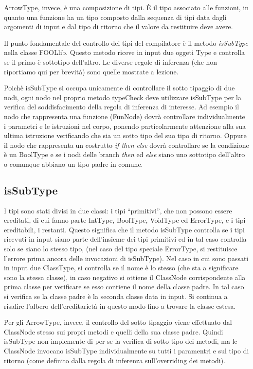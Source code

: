 \documentclass{scrreprt}
\begin{document}
ArrowType, invece, è una composizione di tipi. È il tipo associato alle funzioni, in quanto una funzione ha un tipo composto dalla sequenza di tipi data dagli argomenti di input e dal tipo di ritorno che il valore da restituire deve avere.

Il punto fondamentale del controllo dei tipi del compilatore è il metodo \textit{isSubType} nella classe FOOLlib. Questo metodo riceve in input
due oggeti Type e controlla se il primo è sottotipo dell'altro. Le diverse regole di inferenza (che non riportiamo qui per brevità) sono quelle mostrate a lezione.

Poichè isSubType si occupa unicamente di controllare il sotto tipaggio di due nodi, ogni nodo nel proprio metodo typeCheck deve utilizzare isSubType per la verifica del soddisfacimento della
regola di inferenza di interesse. Ad esempio il nodo che rappresenta una funzione (FunNode) dovrà controllare individualmente i parametri e le istruzioni nel corpo, ponendo particolarmente attenzione alla sua ultima istruzione verificando che sia un sotto tipo del suo tipo di ritorno. 
Oppure il nodo che rappresenta un costrutto \textit{if then else} dovrà
controllare se la condizione è un BoolType e se i nodi delle branch \textit{then} ed \textit{else} siano uno sottotipo dell'altro o comunque abbiano un tipo padre in comune.

\subsection{isSubType}

I tipi sono stati divisi in due classi: i tipi ``primitivi'', che non possono essere ereditati, di cui fanno parte
IntType, BoolType, VoidType ed ErrorType, e i tipi ereditabili, i restanti. Questo significa che il metodo isSubType 
controlla se i tipi ricevuti in input siano parte dell'insieme dei tipi primitivi ed in tal caso controlla solo se siano lo
stesso tipo, (nel caso del tipo speciale ErrorType, si restituisce l'errore prima ancora delle invocazioni di isSubType).
Nel caso in cui sono passati in input due ClassType, si controlla se il nome è lo stesso (che sta a significare sono la stessa classe), in caso negativo si 
ottiene il ClassNode corrispondente alla prima classe per verificare se esso contiene il nome della classe padre. In tal caso
si verifica se la classe padre è la seconda classe data in input. Si continua a risalire l'albero dell'ereditarietà in questo modo fino a trovare la classe estesa.

Per gli ArrowType, invece, il controllo del sotto tipaggio viene effettuato dal ClassNode stesso sui propri metodi e quelli della sua classe padre. Quindi isSubType
non implemente di per se la verifica di sotto tipo dei metodi, ma le ClassNode invocano isSubType individualmente su tutti i paramentri e sul tipo di ritorno (come definito dalla regola di inferenza sull'overriding dei metodi).
\end{document}
